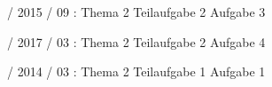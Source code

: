 \documentclass{lehramt-informatik-haupt}
\begin{document}
%

 / 2015 / 09 : Thema 2 Teilaufgabe 2 Aufgabe 3

%

 / 2017 / 03 : Thema 2 Teilaufgabe 2 Aufgabe 4

%

 / 2014 / 03 : Thema 2 Teilaufgabe 1 Aufgabe 1

\literatur
\end{document}
